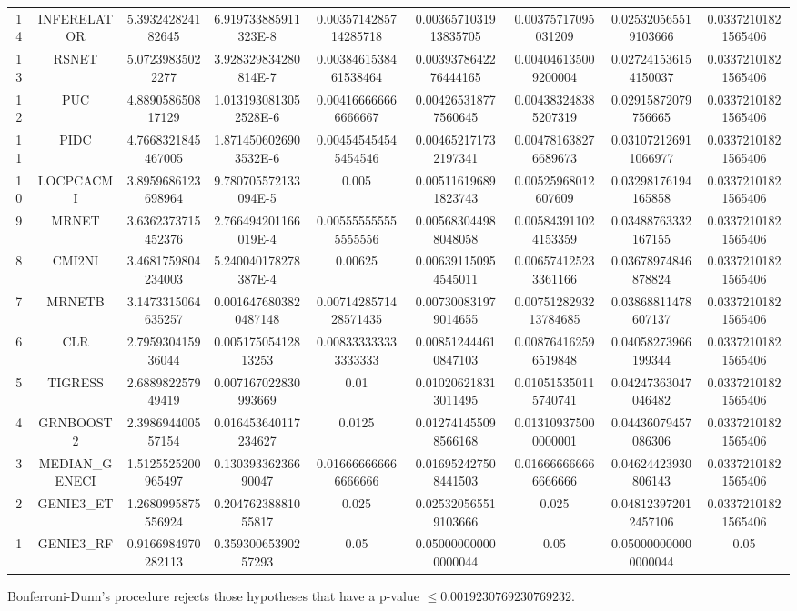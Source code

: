 \documentclass[a4paper,10pt]{article}
\begin{document}
\begin{landscape}
\begin{table}[!htp]
\begin{tabular}{ccccccccc}
14&INFERELATOR&5.393242824182645&6.919733885911323E-8&0.0035714285714285718&0.0036571031913835705&0.00375717095031209&0.025320565519103666&0.03372101821565406\\
13&RSNET&5.07239835022277&3.928329834280814E-7&0.0038461538461538464&0.0039378642276444165&0.004046135009200004&0.027241536154150037&0.03372101821565406\\
12&PUC&4.889058650817129&1.0131930813052528E-6&0.004166666666666667&0.004265318777560645&0.004383248385207319&0.02915872079756665&0.03372101821565406\\
11&PIDC&4.7668321845467005&1.8714506026903532E-6&0.004545454545454546&0.004652171732197341&0.004781638276689673&0.031072126911066977&0.03372101821565406\\
10&LOCPCACMI&3.8959686123698964&9.780705572133094E-5&0.005&0.005116196891823743&0.00525968012607609&0.03298176194165858&0.03372101821565406\\
9&MRNET&3.6362373715452376&2.766494201166019E-4&0.005555555555555556&0.005683044988048058&0.005843911024153359&0.03488763332167155&0.03372101821565406\\
8&CMI2NI&3.4681759804234003&5.240040178278387E-4&0.00625&0.006391150954545011&0.006574125233361166&0.03678974846878824&0.03372101821565406\\
7&MRNETB&3.1473315064635257&0.0016476803820487148&0.0071428571428571435&0.007300831979014655&0.0075128293213784685&0.03868811478607137&0.03372101821565406\\
6&CLR&2.795930415936044&0.00517505412813253&0.008333333333333333&0.008512444610847103&0.008764162596519848&0.04058273966199344&0.03372101821565406\\
5&TIGRESS&2.688982257949419&0.007167022830993669&0.01&0.010206218313011495&0.010515350115740741&0.04247363047046482&0.03372101821565406\\
4&GRNBOOST2&2.398694400557154&0.016453640117234627&0.0125&0.012741455098566168&0.013109375000000001&0.04436079457086306&0.03372101821565406\\
3&MEDIAN_GENECI&1.5125525200965497&0.13039336236690047&0.016666666666666666&0.016952427508441503&0.016666666666666666&0.04624423930806143&0.03372101821565406\\
2&GENIE3_ET&1.2680995875556924&0.20476238881055817&0.025&0.025320565519103666&0.025&0.048123972012457106&0.03372101821565406\\
1&GENIE3_RF&0.9166984970282113&0.35930065390257293&0.05&0.050000000000000044&0.05&0.050000000000000044&0.05\\
\hline
\end{tabular}
\end{table}
Bonferroni-Dunn's procedure rejects those hypotheses that have a p-value $\le0.0019230769230769232$.



\end{landscape}
\end{document}
